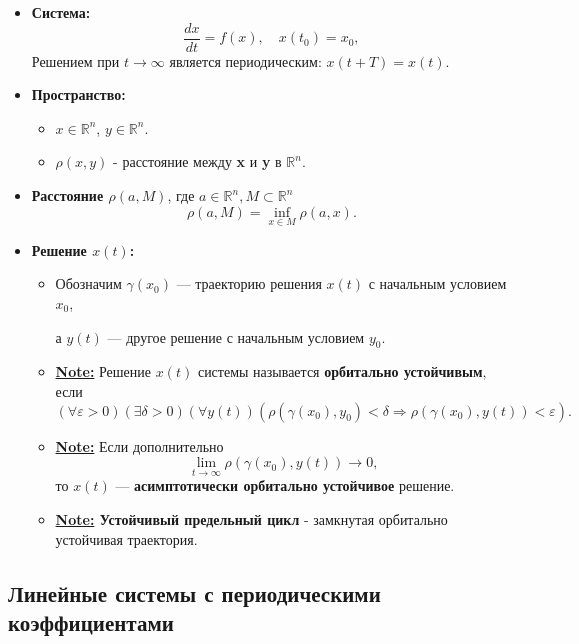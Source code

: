 	\begin{itemize}[leftmargin=1em]
		\item \textbf{Система:}
		\begin{equation}
			\frac{d x}{d t} = f(x), \quad x(t_0) = x_0,
		\end{equation}
		Решением при \(t \to \infty\) является периодическим: \(x(t + T) = x(t)\).
		\item \textbf{Пространство:}
		\begin{itemize}
			\item \(x \in \mathbb{R}^n\), \(y \in \mathbb{R}^n\).
			\item \(\rho(x, y)\) - расстояние между \textbf{x} и \textbf{y} в \( \mathbb{R}^n \).
		\end{itemize}
		\item \textbf{Расстояние \(\rho(a, M)\)}, где \( a \in \mathbb{R}^n, M \subset \mathbb{R}^n \)
		\begin{equation}
			\rho(a, M) = \inf_{x \in M} \rho(a, x).
		\end{equation}
		\item \textbf{Решение \(x(t)\):}
		\begin{itemize}
			\item Обозначим \( \gamma(x_0) \) — траекторию решения \( x(t) \) с начальным условием \( x_0 \), 
			\par 
			а \( y(t) \) — другое решение с начальным условием \( y_0 \).
			\item \textbf{\uline{Note:}} Решение \( x(t) \) системы  называется \textbf{орбитально устойчивым}, если
			\begin{equation}
				(\forall \varepsilon > 0)(\exists \delta > 0)(\forall y(t)) \left( \rho(\gamma(x_0), y_0) < \delta \Rightarrow \rho(\gamma(x_0), y(t)) < \varepsilon \right).
			\end{equation}
			\item \textbf{\uline{Note:}} Если дополнительно
			\begin{equation}
				\lim_{t \to \infty} \rho(\gamma(x_0), y(t)) \to 0,
			\end{equation}
			то \( x(t) \) — \textbf{асимптотически орбитально устойчивое} решение.
			\item \textbf{\uline{Note:} Устойчивый предельный цикл} - замкнутая орбитально устойчивая траектория. 
		\end{itemize}
	\end{itemize}
	
	\subsection{Линейные системы с периодическими коэффициентами}
	
